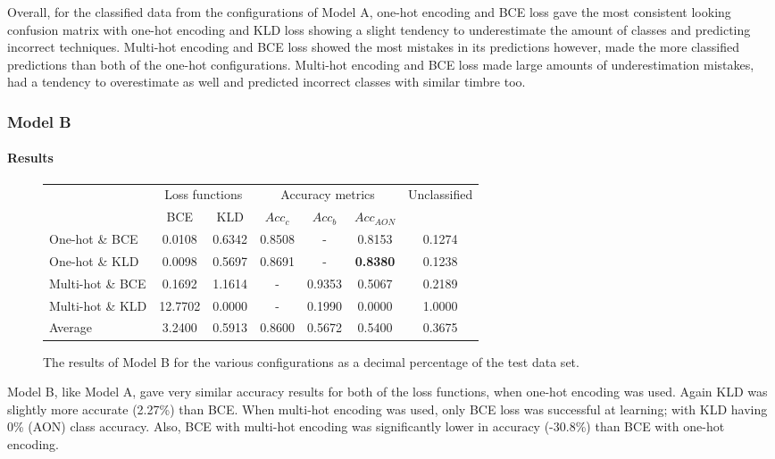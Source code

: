\documentclass[12pt]{article}
\begin{document}
	Overall, for the classified data from the configurations of Model A, one-hot encoding and BCE loss gave the most consistent looking confusion matrix with one-hot encoding and KLD loss showing a slight tendency to underestimate the amount of classes and predicting incorrect techniques. Multi-hot encoding and BCE loss showed the most mistakes in its predictions however, made the more classified predictions than both of the one-hot configurations. Multi-hot encoding and BCE loss made large amounts of underestimation mistakes, had a tendency to overestimate as well and predicted incorrect classes with similar timbre too.\medskip
	
	\subsubsection{Model B}
	\label{sec:evaluation_analysis_modelB}
	
	\paragraph*{Results}
	
	\begin{figure}[H]
	    \centering
	    \begin{tabular}{l|c|c|c|c|c|c|}
	        & \multicolumn{2}{c|}{Loss functions} & \multicolumn{3}{c|}{Accuracy metrics} & \multirow{2}{*}{Unclassified}\\
	        \cline{2-6}
	        & BCE & KLD & $Acc_{c}$ & $Acc_{b}$ & $Acc_{AON}$ &\\
	        \hline
	        One-hot \& BCE & 0.0108 & 0.6342 & 0.8508 & - & 0.8153 & 0.1274\\
	        \hline
	        One-hot \& KLD & 0.0098 & 0.5697 & 0.8691 & - & \textbf{0.8380} & 0.1238\\
	        \hline
	        Multi-hot \& BCE & 0.1692 & 1.1614 & - & 0.9353 & 0.5067 & 0.2189\\
	        \hline
	        Multi-hot \& KLD & 12.7702 & 0.0000 & - & 0.1990 & 0.0000 & 1.0000\\
	        \bottomrule
	        Average & 3.2400 & 0.5913 & 0.8600 & 0.5672 & 0.5400 & 0.3675\\
	       \bottomrule
	    \end{tabular}
	    \caption{The results of Model B for the various configurations as a decimal percentage of the test data set.}
	    \label{fig:modelB}
	\end{figure}
	
	Model B, like Model A, gave very similar accuracy results for both of the loss functions, when one-hot encoding was used. Again KLD was slightly more accurate (2.27\%) than BCE. When multi-hot encoding was used, only BCE loss was successful at learning; with KLD having 0\% (AON) class accuracy. Also, BCE with multi-hot encoding was significantly lower in accuracy (-30.8\%) than BCE with one-hot encoding.\medskip
	
\end{document}

